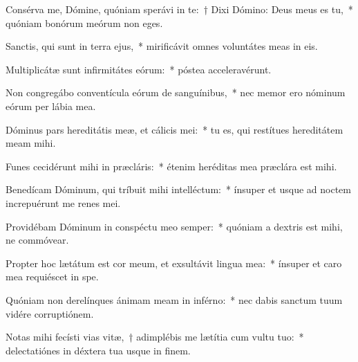 \item Consérva me, Dómine, quóniam sperávi in te:~† Dixi Dómino: Deus meus es tu,~* quóniam bonórum meórum non eges.

\item Sanctis, qui sunt in terra ejus,~* mirificávit omnes voluntátes meas in eis.

\item Multiplicátæ sunt infirmitátes eórum:~* póstea acceleravérunt.

\item Non congregábo conventícula eórum de sanguínibus,~* nec memor ero nóminum eórum per lábia mea.

\item Dóminus pars hereditátis meæ, et cálicis mei:~* tu es, qui restítues hereditátem meam mihi.

\item Funes cecidérunt mihi in præcláris:~* étenim heréditas mea præclára est mihi.

\item Benedícam Dóminum, qui tríbuit mihi intelléctum:~* ínsuper et usque ad noctem increpuérunt me renes mei.

\item Providébam Dóminum in conspéctu meo semper:~* quóniam a dextris est mihi, ne commóvear.

\item Propter hoc lætátum est cor meum, et exsultávit lingua mea:~* ínsuper et caro mea requiéscet in spe.

\item Quóniam non derelínques ánimam meam in inférno:~* nec dabis sanctum tuum vidére corruptiónem.

\item Notas mihi fecísti vias vitæ,~† adimplébis me lætítia cum vultu tuo:~* delectatiónes in déxtera tua usque in finem.

